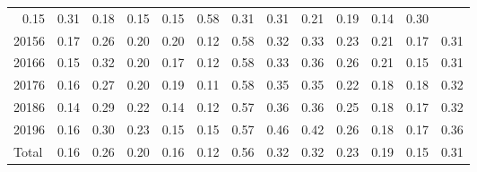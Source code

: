 \begin{table}[!h]
\begin{tabular}{lllllllllllll}
  \multicolumn{1}{|r}{0.15} &
  \multicolumn{1}{r}{0.31} &
  \multicolumn{1}{r}{0.18} &
  \multicolumn{1}{r}{0.15} &
  \multicolumn{1}{r}{0.15} &
  \multicolumn{1}{r}{0.58} &
  \multicolumn{1}{r}{0.31} &
  \multicolumn{1}{r}{0.31} &
  \multicolumn{1}{r}{0.21} &
  \multicolumn{1}{r}{0.19} &
  \multicolumn{1}{r}{0.14} &
  \multicolumn{1}{r}{0.30} \\
\multicolumn{1}{l}{\hspace{1em}20156} &
  \multicolumn{1}{|r}{0.17} &
  \multicolumn{1}{r}{0.26} &
  \multicolumn{1}{r}{0.20} &
  \multicolumn{1}{r}{0.20} &
  \multicolumn{1}{r}{0.12} &
  \multicolumn{1}{r}{0.58} &
  \multicolumn{1}{r}{0.32} &
  \multicolumn{1}{r}{0.33} &
  \multicolumn{1}{r}{0.23} &
  \multicolumn{1}{r}{0.21} &
  \multicolumn{1}{r}{0.17} &
  \multicolumn{1}{r}{0.31} \\
\multicolumn{1}{l}{\hspace{1em}20166} &
  \multicolumn{1}{|r}{0.15} &
  \multicolumn{1}{r}{0.32} &
  \multicolumn{1}{r}{0.20} &
  \multicolumn{1}{r}{0.17} &
  \multicolumn{1}{r}{0.12} &
  \multicolumn{1}{r}{0.58} &
  \multicolumn{1}{r}{0.33} &
  \multicolumn{1}{r}{0.36} &
  \multicolumn{1}{r}{0.26} &
  \multicolumn{1}{r}{0.21} &
  \multicolumn{1}{r}{0.15} &
  \multicolumn{1}{r}{0.31} \\
\multicolumn{1}{l}{\hspace{1em}20176} &
  \multicolumn{1}{|r}{0.16} &
  \multicolumn{1}{r}{0.27} &
  \multicolumn{1}{r}{0.20} &
  \multicolumn{1}{r}{0.19} &
  \multicolumn{1}{r}{0.11} &
  \multicolumn{1}{r}{0.58} &
  \multicolumn{1}{r}{0.35} &
  \multicolumn{1}{r}{0.35} &
  \multicolumn{1}{r}{0.22} &
  \multicolumn{1}{r}{0.18} &
  \multicolumn{1}{r}{0.18} &
  \multicolumn{1}{r}{0.32} \\
\multicolumn{1}{l}{\hspace{1em}20186} &
  \multicolumn{1}{|r}{0.14} &
  \multicolumn{1}{r}{0.29} &
  \multicolumn{1}{r}{0.22} &
  \multicolumn{1}{r}{0.14} &
  \multicolumn{1}{r}{0.12} &
  \multicolumn{1}{r}{0.57} &
  \multicolumn{1}{r}{0.36} &
  \multicolumn{1}{r}{0.36} &
  \multicolumn{1}{r}{0.25} &
  \multicolumn{1}{r}{0.18} &
  \multicolumn{1}{r}{0.17} &
  \multicolumn{1}{r}{0.32} \\
\multicolumn{1}{l}{\hspace{1em}20196} &
  \multicolumn{1}{|r}{0.16} &
  \multicolumn{1}{r}{0.30} &
  \multicolumn{1}{r}{0.23} &
  \multicolumn{1}{r}{0.15} &
  \multicolumn{1}{r}{0.15} &
  \multicolumn{1}{r}{0.57} &
  \multicolumn{1}{r}{0.46} &
  \multicolumn{1}{r}{0.42} &
  \multicolumn{1}{r}{0.26} &
  \multicolumn{1}{r}{0.18} &
  \multicolumn{1}{r}{0.17} &
  \multicolumn{1}{r}{0.36} \\
\multicolumn{1}{l}{\hspace{1em}Total} &
  \multicolumn{1}{|r}{0.16} &
  \multicolumn{1}{r}{0.26} &
  \multicolumn{1}{r}{0.20} &
  \multicolumn{1}{r}{0.16} &
  \multicolumn{1}{r}{0.12} &
  \multicolumn{1}{r}{0.56} &
  \multicolumn{1}{r}{0.32} &
  \multicolumn{1}{r}{0.32} &
  \multicolumn{1}{r}{0.23} &
  \multicolumn{1}{r}{0.19} &
  \multicolumn{1}{r}{0.15} &
  \multicolumn{1}{r}{0.31} \\
\cline{1-13}
\end{tabular}
\end{table}
